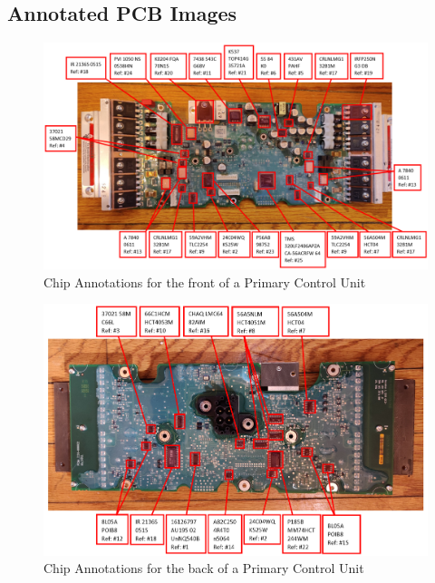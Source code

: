 \documentclass[]{formalLabReport}
\begin{document}
\subsection{Annotated PCB Images}

\begin{figure}
    \includegraphics[]{annotatedBoardFront.png}
    \caption{Chip Annotations for the front of a Primary Control Unit}
    \label{fig:annotatedBoardFront.png}
\end{figure}

\begin{figure}
    \includegraphics[]{annotatedBoardBack.png}
    \caption{Chip Annotations for the back of a Primary Control Unit}
    \label{fig:annotatedBoardBack.png}
\end{figure}
\end{document}
